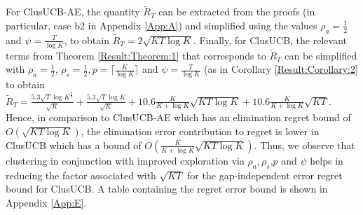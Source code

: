 For ClusUCB-AE, the quantity $\widetilde R_T$ can be extracted from the proofs (in particular, case b2 in Appendix \ref{App:A}) and simplified using the values $\rho_{a}=\frac{1}{2}$ and $\psi=\frac{T}{\log K}$, to obtain $\widetilde R_T = 2\sqrt{KT\log K}$. 
Finally, for ClusUCB, the relevant terms from Theorem \ref{Result:Theorem:1} that corresponds to $\widetilde R_T$ can be simplified with $\rho_{a}=\frac{1}{2}$, $\rho_{s}=\frac{1}{2},p=\big\lceil \frac{K}{\log K} \big\rceil$ and $\psi=\frac{T}{\log K}$ (as in Corollary \ref{Result:Corollary:2} to obtain  
$\tilde R_T = \frac{5.3 \sqrt{T}\log K^{\frac{3}{2}} }{\sqrt{K}} + \frac{5.3 \sqrt{T}\log K}{\sqrt{K}} + 10.6 \frac{K}{K+\log K}\sqrt{KT\log K} + 10.6 \frac{K}{K+\log K}\sqrt{KT}$. Hence, in comparison to ClusUCB-AE which has an elimination regret bound of $O(\sqrt{KT\log K})$, the elimination error contribution to regret is lower in ClusUCB which has a bound of $O(\frac{K}{K+\log K}\sqrt{KT\log K})$. Thus, we observe that clustering in conjunction with improved exploration via $\rho_{a},\rho_{s}$,$p$ and $\psi$ helps in reducing the factor associated with $\sqrt{KT}$ for the gap-independent error regret bound for ClusUCB. A table containing the regret error bound is shown in Appendix \ref{App:E}. 
